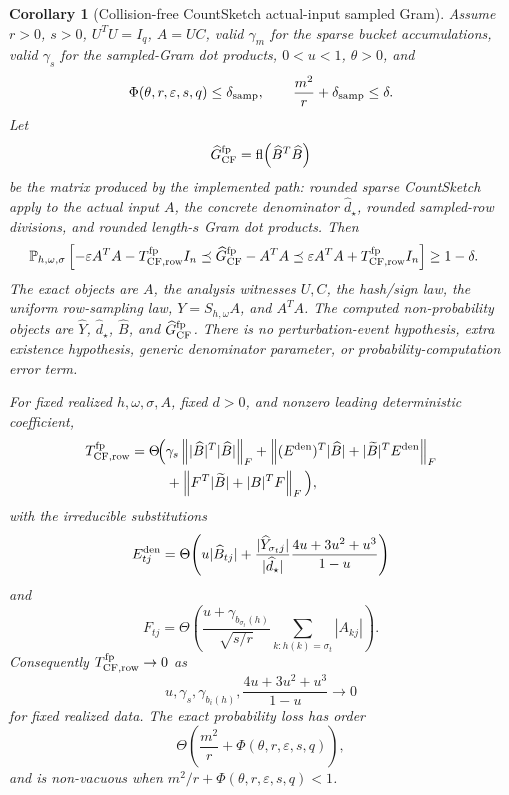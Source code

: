 \documentclass[11pt]{article}
\newcommand{\Prob}{\mathbb{P}}
\newcommand{\Frob}[1]{\left\lVert #1\right\rVert_F}
\newcommand{\fl}{\operatorname{fl}}
\newcommand{\I}{I}
\newcommand{\eps}{\varepsilon}
\newtheorem{corollary}[theorem]{Corollary}
\theoremstyle{remark}
\begin{document}
\begin{corollary}[Collision-free CountSketch actual-input sampled Gram]
Assume \(r>0\), \(s>0\), \(U^TU=\I_q\), \(A=UC\), valid \(\gamma_m\) for the
sparse bucket accumulations, valid \(\gamma_s\) for the sampled-Gram dot
products, \(0<u<1\), \(\theta>0\), and
\[
  \Phi(\theta,r,\eps,s,q)\le\delta_{\rm samp},
  \qquad
  \frac{m^2}{r}+\delta_{\rm samp}\le\delta .
\]
Let
\[
  \widehat G_{\rm CF}^{\rm fp}
  =
  \fl\!\left(\widehat B^T\widehat B\right)
\]
be the matrix produced by the implemented path: rounded sparse CountSketch
apply to the actual input \(A\), the concrete denominator
\(\widehat d_\star\), rounded sampled-row divisions, and rounded length-\(s\)
Gram dot products.  Then
\[
\begin{aligned}
&\Prob_{h,\omega,\sigma}
  \left[
    -\eps A^TA-T_{\rm CF,row}^{\rm fp}\I_n
    \preceq
    \widehat G_{\rm CF}^{\rm fp}-A^TA
    \preceq
    \eps A^TA+T_{\rm CF,row}^{\rm fp}\I_n
  \right]
  \ge 1-\delta .
\end{aligned}
\]
The exact objects are \(A\), the analysis witnesses \(U,C\), the hash/sign
law, the uniform row-sampling law, \(Y=S_{h,\omega}A\), and \(A^TA\).  The
computed non-probability objects are \(\widehat Y\), \(\widehat d_\star\),
\(\widehat B\), and \(\widehat G_{\rm CF}^{\rm fp}\).  There is no
perturbation-event hypothesis, extra existence hypothesis, generic
denominator parameter, or probability-computation error term.

For fixed realized \(h,\omega,\sigma,A\), fixed \(d>0\), and nonzero leading
deterministic coefficient,
\[
\begin{aligned}
  T_{\rm CF,row}^{\rm fp}
  =
  \Theta\!\Big(
  &\gamma_s\Frob{|\widehat B|^T|\widehat B|}
  +
  \Frob{(E^{\rm den})^T|\widehat B|
        +|\widetilde B|^TE^{\rm den}}
  \\
  &+
  \Frob{F^T|\widetilde B|+|B|^TF}
  \Big),
\end{aligned}
\]
with the irreducible substitutions
\[
  E^{\rm den}_{tj}
  =
  \Theta\!\left(
    u|\widehat B_{tj}|
    +
    \frac{|\widehat Y_{\sigma_tj}|}{|\widehat d_\star|}
    \frac{4u+3u^2+u^3}{1-u}
  \right)
\]
and
\[
  F_{tj}
  =
  \Theta\!\left(
    \frac{u+\gamma_{b_{\sigma_t}(h)}}{\sqrt{s/r}}
    \sum_{k:h(k)=\sigma_t}|A_{kj}|
  \right).
\]
Consequently \(T_{\rm CF,row}^{\rm fp}\to0\) as
\[
  u,\gamma_s,\gamma_{b_i(h)},\frac{4u+3u^2+u^3}{1-u}\to0
\]
for fixed realized data.  The exact probability loss has order
\[
  \Theta\!\left(\frac{m^2}{r}+\Phi(\theta,r,\eps,s,q)\right),
\]
and is non-vacuous when \(m^2/r+\Phi(\theta,r,\eps,s,q)<1\).
\end{corollary}
\end{document}
